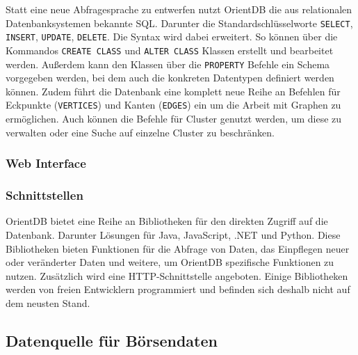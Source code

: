 
Statt eine neue Abfragesprache zu entwerfen nutzt OrientDB die aus relationalen Datenbanksystemen bekannte \gls{SQL}. Darunter die Standardschlüsselworte \texttt{SELECT}, \texttt{INSERT}, \texttt{UPDATE}, \texttt{DELETE}. Die Syntax wird dabei erweitert. So können über die Kommandos \texttt{CREATE CLASS} und \texttt{ALTER CLASS} Klassen erstellt und bearbeitet werden. Außerdem kann den Klassen über die \texttt{PROPERTY} Befehle ein Schema vorgegeben werden, bei dem auch die konkreten Datentypen definiert werden können. Zudem führt die Datenbank eine komplett neue Reihe an Befehlen für Eckpunkte (\texttt{VERTICES}) und Kanten (\texttt{EDGES}) ein um die Arbeit mit Graphen zu ermöglichen. Auch können die Befehle für Cluster genutzt werden, um diese zu verwalten oder eine Suche auf einzelne Cluster zu beschränken.


\subsubsection{Web Interface}

\subsubsection{Schnittstellen}


OrientDB bietet eine Reihe an Bibliotheken für den direkten Zugriff auf die Datenbank. Darunter Lösungen für Java, JavaScript, .NET und Python. Diese Bibliotheken bieten Funktionen für die Abfrage von Daten, das Einpflegen neuer oder veränderter Daten und weitere, um OrientDB spezifische Funktionen zu nutzen. Zusätzlich wird eine \gls{HTTP}-Schnittstelle angeboten. Einige Bibliotheken werden von freien Entwicklern programmiert und befinden sich deshalb nicht auf dem neusten Stand.

\subsection{Datenquelle für Börsendaten}

